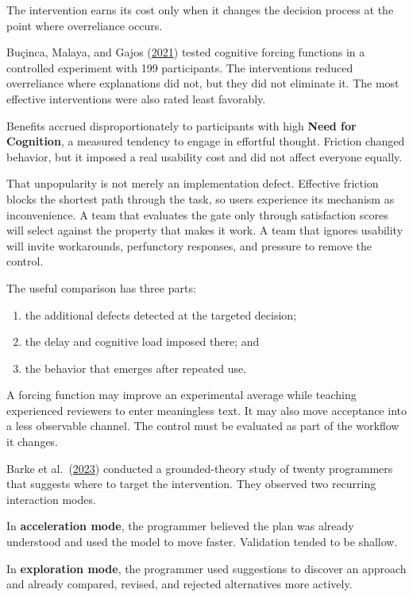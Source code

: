 The intervention earns its cost only when it changes the decision process at the point where overreliance occurs.

Buçinca, Malaya, and Gajos (\href{https://arxiv.org/abs/2102.09692}{2021}) tested cognitive forcing functions in a controlled experiment with 199 participants. The interventions reduced overreliance where explanations did not, but they did not eliminate it. The most effective interventions were also rated least favorably.

Benefits accrued disproportionately to participants with high \textbf{Need for Cognition}, a measured tendency to engage in effortful thought. Friction changed behavior, but it imposed a real usability cost and did not affect everyone equally.

That unpopularity is not merely an implementation defect. Effective friction blocks the shortest path through the task, so users experience its mechanism as inconvenience. A team that evaluates the gate only through satisfaction scores will select against the property that makes it work. A team that ignores usability will invite workarounds, perfunctory responses, and pressure to remove the control.

The useful comparison has three parts:

\begin{enumerate}
\def\labelenumi{\arabic{enumi}.}
\tightlist
\item
  the additional defects detected at the targeted decision;
\item
  the delay and cognitive load imposed there; and
\item
  the behavior that emerges after repeated use.
\end{enumerate}

A forcing function may improve an experimental average while teaching experienced reviewers to enter meaningless text. It may also move acceptance into a less observable channel. The control must be evaluated as part of the workflow it changes.

Barke et al.~(\href{https://arxiv.org/abs/2206.15000}{2023}) conducted a grounded-theory study of twenty programmers that suggests where to target the intervention. They observed two recurring interaction modes.

In \textbf{acceleration mode}, the programmer believed the plan was already understood and used the model to move faster. Validation tended to be shallow.

In \textbf{exploration mode}, the programmer used suggestions to discover an approach and already compared, revised, and rejected alternatives more actively.

